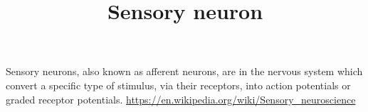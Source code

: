 \documentclass[a4paper]{standalone}
\title{Sensory neuron}
\begin{document}
    \maketitle
    Sensory neurons, also known as afferent neurons, are in the nervous system which convert a specific type of stimulus, via their receptors, into action potentials or graded receptor potentials.
    \url{https://en.wikipedia.org/wiki/Sensory_neuroscience}
\end{document}

